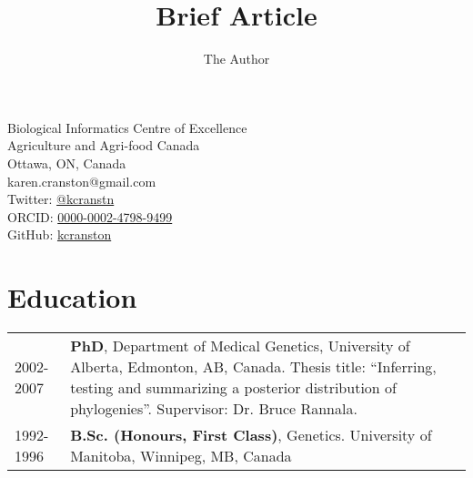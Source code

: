 \documentclass[10pt]{article}
\title{Brief Article}
\author{The Author}
\begin{document}
Biological Informatics Centre of Excellence  \\
Agriculture and Agri-food Canada \\
Ottawa, ON, Canada \\
karen.cranston@gmail.com \\
Twitter: \href{https://twitter.com/kcranstn}{@kcranstn} \\
ORCID: \href{http://orcid.org/0000-0002-4798-9499}{0000-0002-4798-9499} \\
GitHub: \href{https://github.com/kcranston}{kcranston}

\section*{Education}
\begin{table}[h]
	\begin{tabular}{ p{2.0cm} p{12.4cm} }
		2002-2007 & {\bf PhD}, Department of Medical Genetics, University of Alberta, Edmonton, AB, Canada. Thesis title: ``Inferring, testing and summarizing a posterior distribution of phylogenies''. Supervisor: Dr. Bruce Rannala. \\
		1992-1996 & {\bf B.Sc. (Honours, First Class)}, Genetics. University of Manitoba, Winnipeg, MB, Canada \\
	\end{tabular}
\end{table}

\end{document}
